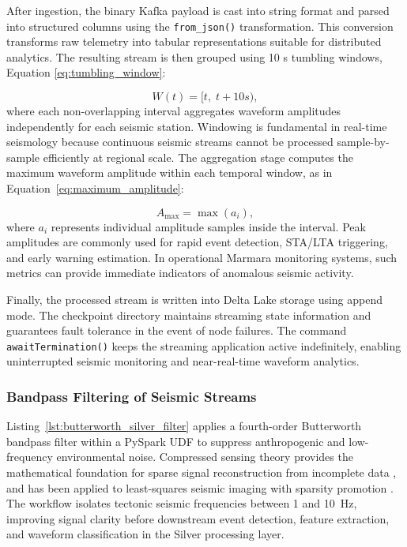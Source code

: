 \documentclass[data,article,accept,pdftex,moreauthors]{Definitions/mdpi}
\begin{document}
After ingestion, the binary Kafka payload is cast into string format and parsed into structured columns using the \texttt{from\_json()} transformation. This conversion transforms raw telemetry into tabular representations suitable for distributed analytics. The resulting stream is then grouped using 10 s tumbling windows, Equation \eqref{eq:tumbling_window}:

\begin{equation}
\label{eq:tumbling_window}
W(t)= [t,\; t+10s),
\end{equation}
where each non-overlapping interval aggregates waveform amplitudes independently for each seismic station. Windowing is fundamental in real-time seismology because continuous seismic streams cannot be processed sample-by-sample efficiently at regional scale. The aggregation stage computes the maximum waveform amplitude within each temporal window, as in Equation~\eqref{eq:maximum_amplitude}:

\begin{equation}
\label{eq:maximum_amplitude}
A_{\max} = \max(a_i),
\end{equation}
where $a_i$ represents individual amplitude samples inside the interval. Peak amplitudes are commonly used for rapid event detection, STA/LTA triggering, and early warning estimation. In operational Marmara monitoring systems, such metrics can provide immediate indicators of anomalous seismic activity.

Finally, the processed stream is written into Delta Lake storage using append mode. The checkpoint directory maintains streaming state information and guarantees fault tolerance in the event of node failures. The command \texttt{awaitTermination()} keeps the streaming application active indefinitely, enabling uninterrupted seismic monitoring and near-real-time waveform analytics.

\subsubsection{Bandpass Filtering of Seismic Streams}

Listing~\ref{lst:butterworth_silver_filter} applies a fourth-order Butterworth bandpass filter within a PySpark UDF to suppress anthropogenic and low-frequency environmental noise. Compressed sensing theory provides the mathematical foundation for sparse signal reconstruction from incomplete data \cite{Donoho2006,Candes2006}, and has been applied to least-squares seismic imaging with sparsity promotion \cite{Herrmann2012}. The workflow isolates tectonic seismic frequencies between 1 and 10~Hz, improving signal clarity before downstream event detection, feature extraction, and waveform classification in the Silver \linebreak processing layer.
\end{document}
